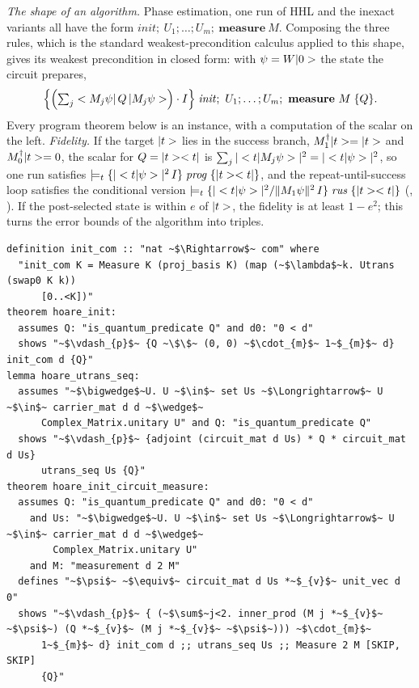 \emph{The shape of an algorithm.} Phase estimation, one run of HHL and the inexact variants all have
the form $\mathit{init};\ U_1;\dots;U_m;\ \mathbf{measure}\ M$. Composing the three rules, which is the standard weakest-precondition calculus applied to this shape,
gives its weakest precondition in closed form: with $\psi=W\ket0$ the state the circuit prepares,
\[
\Bigl\{\Bigl(\textstyle\sum_j\langle M_j\psi|\,Q\,|M_j\psi\rangle\Bigr)\cdot I\Bigr\}\;
\mathit{init};\ U_1;\dots;U_m;\ \mathbf{measure}\ M\;\{Q\}.
\]
Every program theorem below is an instance, with a computation of the scalar on the left.
\emph{Fidelity.} If the target $\ket t$ lies in the success branch, $M_1^\dagger\ket t=\ket t$ and
$M_0^\dagger\ket t=0$, the scalar for $Q=\ketbra tt$ is $\sum_j|\braket t{M_j\psi}|^2=|\braket t\psi|^2$,
so one run satisfies $\hoaret{|\braket t\psi|^2\,I}{\mathit{prog}}{\ketbra tt}$, and the
repeat-until-success loop satisfies the conditional version
$\hoaret{|\braket t\psi|^2/\norm{M_1\psi}^2\,I}{\mathit{rus}}{\ketbra tt}$
(, ). If the post-selected state is within $e$ of
$\ket t$, the fidelity is at least $1-e^2$; this turns the error bounds of the algorithm into triples.

\begin{lstlisting}[float=tp,caption={Initialisation, gate lists, and the weakest precondition of the shape $\mathit{init};\,\mathit{gates};\,\mathbf{measure}$},label={lst:derived}]
definition init_com :: "nat ~$\Rightarrow$~ com" where
  "init_com K = Measure K (proj_basis K) (map (~$\lambda$~k. Utrans (swap0 K k))
      [0..<K])"
theorem hoare_init:
  assumes Q: "is_quantum_predicate Q" and d0: "0 < d"
  shows "~$\vdash_{p}$~ {Q ~\$\$~ (0, 0) ~$\cdot_{m}$~ 1~$_{m}$~ d} init_com d {Q}"
lemma hoare_utrans_seq:
  assumes "~$\bigwedge$~U. U ~$\in$~ set Us ~$\Longrightarrow$~ U ~$\in$~ carrier_mat d d ~$\wedge$~
      Complex_Matrix.unitary U" and Q: "is_quantum_predicate Q"
  shows "~$\vdash_{p}$~ {adjoint (circuit_mat d Us) * Q * circuit_mat d Us}
      utrans_seq Us {Q}"
theorem hoare_init_circuit_measure:
  assumes Q: "is_quantum_predicate Q" and d0: "0 < d"
    and Us: "~$\bigwedge$~U. U ~$\in$~ set Us ~$\Longrightarrow$~ U ~$\in$~ carrier_mat d d ~$\wedge$~
        Complex_Matrix.unitary U"
    and M: "measurement d 2 M"
  defines "~$\psi$~ ~$\equiv$~ circuit_mat d Us *~$_{v}$~ unit_vec d 0"
  shows "~$\vdash_{p}$~ { (~$\sum$~j<2. inner_prod (M j *~$_{v}$~ ~$\psi$~) (Q *~$_{v}$~ (M j *~$_{v}$~ ~$\psi$~))) ~$\cdot_{m}$~
      1~$_{m}$~ d} init_com d ;; utrans_seq Us ;; Measure 2 M [SKIP, SKIP]
      {Q}"
\end{lstlisting}

